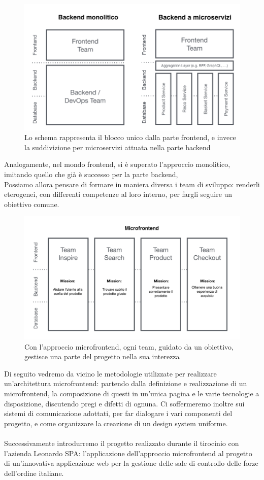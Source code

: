 \begin{figure}[H]
    \centering
    \includegraphics[width=140mm]{img/monolite}
    \caption{Lo schema rappresenta il blocco unico dalla parte frontend, e invece la suddivizione per 
    microservizi attuata nella parte backend}
  \end{figure}
Analogamente, nel mondo frontend, si è superato l'approccio monolitico, imitando quello che già è 
successo per la parte backend,
\\
Possiamo allora pensare di formare in maniera diversa i team di sviluppo: renderli eterogenei, con differenti competenze al
loro interno, per fargli seguire un obiettivo comune.
\begin{figure}[H]
    \centering
    \includegraphics[width=140mm]{img/microfrontend}
    \caption{Con l'approccio microfrontend, ogni team, guidato da un obiettivo, gestisce una 
    parte del progetto nella sua interezza}
  \end{figure}

  Di seguito vedremo da vicino le metodologie utilizzate per realizzare un'architettura microfrontend:
partendo dalla definizione e realizzazione di un microfrontend, la composizione di questi in un'unica pagina e le varie tecnologie
  a disposizione, discutendo pregi e difetti di ognuna.
  Ci soffermeremo inoltre sui sistemi di comunicazione adottati, per far dialogare i vari componenti del progetto, e come organizzare 
  la creazione di un design system uniforme.
\\\\
  Successivamente introdurremo il progetto realizzato durante il tirocinio con l'azienda Leonardo SPA: l'applicazione dell'approccio microfrontend
  al progetto di un'innovativa applicazione web per la gestione delle sale di controllo delle forze dell'ordine italiane.

